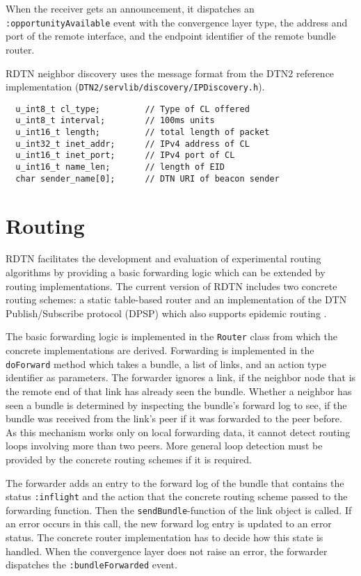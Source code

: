 \documentclass{article}
\begin{document}
When the receiver gets an announcement, it dispatches an {\tt
:opportunityAvailable} event with the convergence layer type, the address and
port of the remote interface, and the endpoint identifier of the remote bundle
router.

RDTN neighbor discovery uses the message format from the DTN2 reference
implementation ({\tt DTN2/servlib/discovery/IPDiscovery.h}).

\begin{verbatim}
  u_int8_t cl_type;         // Type of CL offered
  u_int8_t interval;        // 100ms units
  u_int16_t length;         // total length of packet
  u_int32_t inet_addr;      // IPv4 address of CL
  u_int16_t inet_port;      // IPv4 port of CL
  u_int16_t name_len;       // length of EID
  char sender_name[0];      // DTN URI of beacon sender
\end{verbatim}

\section{Routing}\label{sec.routing}

RDTN facilitates the development and evaluation of experimental routing
algorithms by providing a basic forwarding logic which can be extended by
routing implementations. The current version of RDTN includes two concrete
routing schemes: a static table-based router and an implementation of the DTN
Publish/Subscribe protocol (DPSP) \cite{dtn-pubsub} which also supports epidemic
routing \cite{epidemic}.

The basic forwarding logic is implemented in the {\tt Router} class from which
the concrete implementations are derived. Forwarding is implemented in the {\tt
doForward} method which takes a bundle, a list of links, and an action type
identifier as parameters. The forwarder ignores a link, if the neighbor node
that is the remote end of that link has already seen the bundle. Whether a
neighbor has seen a bundle is determined by inspecting the bundle's forward log
to see, if the bundle was received from the link's peer if it was forwarded
to the peer before. As this mechanism works only on local forwarding data, it
cannot detect routing loops involving more than two peers.  More general loop
detection must be provided by the concrete routing schemes if it is required.

The forwarder adds an entry to the forward log of the bundle that contains the
status {\tt :inflight} and the action that the concrete routing scheme passed to
the forwarding function. Then the {\tt sendBundle}-function of the link object
is called. If an error occurs in this call, the new forward log entry is updated
to an error status. The concrete router implementation has to decide how this
state is handled. When the convergence layer does not raise an error, the
forwarder dispatches the {\tt :bundleForwarded} event.
\end{document}
